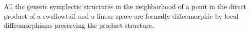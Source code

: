 All the generic symplectic structures in the neighborhood of a point in the direct product of a swallowtail and a linear space are formally diffeomorphic by local diffeomorphisms preserving the product structure.
